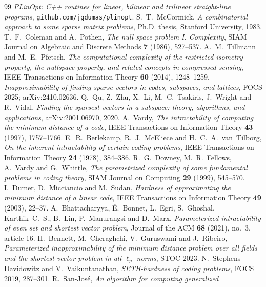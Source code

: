 \documentclass[11pt,reqno]{amsart}
\theoremstyle{plain}
\theoremstyle{definition}
\theoremstyle{remark}
\begin{document}
\begin{thebibliography}{99}
  \emph{PLinOpt: C++ routines for linear, bilinear and trilinear straight-line
  programs}, \texttt{github.com/jgdumas/plinopt}.
 S.~T.~McCormick, \emph{A combinatorial approach to some
  sparse matrix problems}, Ph.D. thesis, Stanford University, 1983.
 T.~F.~Coleman and A.~Pothen, \emph{The null space
  problem I. Complexity}, SIAM Journal on Algebraic and Discrete Methods
  \textbf{7} (1986), 527--537.
 A.~M.~Tillmann and M.~E.~Pfetsch, \emph{The computational
  complexity of the restricted isometry property, the nullspace property, and
  related concepts in compressed sensing}, IEEE Transactions on Information
  Theory \textbf{60} (2014), 1248--1259.
 \emph{Inapproximability of finding sparse vectors
  in codes, subspaces, and lattices}, FOCS 2025; arXiv:2410.02636.
 Q.~Qu, Z.~Zhu, X.~Li, M.~C.~Tsakiris, J.~Wright and R.~Vidal,
  \emph{Finding the sparsest vectors in a subspace: theory, algorithms, and
  applications}, arXiv:2001.06970, 2020.
 A.~Vardy, \emph{The intractability of computing the minimum
  distance of a code}, IEEE Transactions on Information Theory \textbf{43}
  (1997), 1757--1766.
 E.~R.~Berlekamp, R.~J.~McEliece and
  H.~C.~A.~van~Tilborg, \emph{On the inherent intractability of certain coding
  problems}, IEEE Transactions on Information Theory \textbf{24} (1978),
  384--386.
 R.~G.~Downey, M.~R.~Fellows, A.~Vardy and G.~Whittle,
  \emph{The parametrized complexity of some fundamental problems in coding
  theory}, SIAM Journal on Computing \textbf{29} (1999), 545--570.
 I.~Dumer, D.~Micciancio and M.~Sudan, \emph{Hardness of
  approximating the minimum distance of a linear code}, IEEE Transactions on
  Information Theory \textbf{49} (2003), 22--37.
 A.~Bhattacharyya, \'E.~Bonnet, L.~Egri, S.~Ghoshal,
  Karthik~C.~S., B.~Lin, P.~Manurangsi and D.~Marx, \emph{Parameterized
  intractability of even set and shortest vector problem}, Journal of the ACM
  \textbf{68} (2021), no.~3, article 16.
 H.~Bennett, M.~Cheraghchi, V.~Guruswami and J.~Ribeiro,
  \emph{Parameterized inapproximability of the minimum distance problem over all
  fields and the shortest vector problem in all $\ell_p$ norms}, STOC 2023.
 N.~Stephens-Davidowitz and V.~Vaikuntanathan,
  \emph{SETH-hardness of coding problems}, FOCS 2019, 287--301.
 R.~San-Jos\'e, \emph{An algorithm for computing generalized
}
\end{thebibliography}
\end{document}
